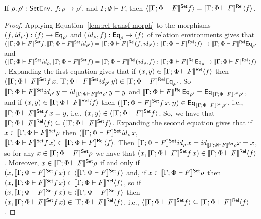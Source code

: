 \documentclass[runningheads]{llncs}
\renewcommand{\id}{\mathit{id}}
\renewcommand{\id}{\mathit{id}}
\begin{document}
%
\begin{lemma}\label{lem:graph}
If $\rho, \rho' : \mathsf{SetEnv}$, $f : \rho \to \rho'$, and $\Gamma; \Phi
\vdash F$, then $\langle {\llbracket{\Gamma; \Phi \vdash F}\rrbracket^{\mathsf{Set}}f} \rangle =
\llbracket{\Gamma; \Phi \vdash F}\rrbracket^{\mathsf{Rel}}\langle {f} \rangle$.
\end{lemma}
\begin{proof}
Applying Equation~\ref{lem:rel-transf-morph} to the morphisms $(f,
\id_{\rho'}) : \graph{f} \to \Eq_{\rho'}$ and $(\id_{\rho}, f) :
\Eq_{\rho} \to \graph{f}$ of relation environments gives that
$(\setsem{\Gamma; \Phi \vdash F}f, \setsem{\Gamma; \Phi \vdash
  F}\id_{\rho'}) = \relsem{\Gamma; \Phi \vdash F} (f, \id_{\rho'}) :
\relsem{\Gamma; \Phi \vdash F}\graph{f} \to \relsem{\Gamma; \Phi
  \vdash F}\Eq_{\rho'}$ and $(\setsem{\Gamma; \Phi \vdash
  F}\id_{\rho}, \setsem{\Gamma; \Phi \vdash F}f) = \relsem{\Gamma;
  \Phi \vdash F} (\id_{\rho}, f) : \relsem{\Gamma; \Phi \vdash
  F}\Eq_{\rho} \to \relsem{\Gamma; \Phi \vdash F}\graph{f}$.
Expanding the first equation gives that if $(x,y) \in \llbracket{\Gamma;
  \Phi \vdash F}\rrbracket^{\mathsf{Rel}}\langle {f} \rangle$ then $(\setsem{\Gamma; \Phi \vdash F} f\,
x, \setsem{\Gamma; \Phi \vdash F}\id_{\rho'}\, y) \in \relsem{\Gamma;
  \Phi \vdash F}\Eq_{\rho'}$. So $\setsem{\Gamma; \Phi \vdash
  F}\id_{\rho'}\, y = \id_{\setsem{\Gamma; \Phi \vdash F}\rho'}\, y =
y$ and $\llbracket{\Gamma; \Phi \vdash F}\rrbracket^{\mathsf{Rel}}\mathsf{Eq}_{\rho'} =
\mathsf{Eq}_{\llbracket{\Gamma; \Phi \vdash F}\rrbracket^{\mathsf{Set}}\rho'}$, and if $(x,y) \in
\llbracket{\Gamma; \Phi \vdash F}\rrbracket^{\mathsf{Rel}}\langle {f} \rangle$ then $(\llbracket{\Gamma; \Phi
  \vdash F}\rrbracket^{\mathsf{Set}} f\, x, y) \in \mathsf{Eq}_{\llbracket{\Gamma; \Phi \vdash F}\rrbracket^{\mathsf{Set}}\rho'}$,
i.e., $\llbracket{\Gamma; \Phi \vdash F}\rrbracket^{\mathsf{Set}} f\, x = y$, i.e., $(x, y) \in
\langle {\llbracket{\Gamma; \Phi \vdash F}\rrbracket^{\mathsf{Set}}f} \rangle$.  So, we have that
$\llbracket{\Gamma; \Phi \vdash F}\rrbracket^{\mathsf{Rel}}\langle {f} \rangle \subseteq
\langle {\llbracket{\Gamma; \Phi \vdash F}\rrbracket^{\mathsf{Set}}f} \rangle$.  Expanding the second
equation gives that if $x \in \llbracket{\Gamma; \Phi \vdash F}\rrbracket^{\mathsf{Set}}\rho$ then
$(\setsem{\Gamma; \Phi \vdash F}\id_{\rho}\, x,$\\
$\llbracket{\Gamma; \Phi
  \vdash F}\rrbracket^{\mathsf{Set}} f\, x) \in \llbracket{\Gamma; \Phi \vdash F}\rrbracket^{\mathsf{Rel}}\langle {f} \rangle$.  Then
$\setsem{\Gamma; \Phi \vdash F}\id_{\rho}\, x = \id_{\setsem{\Gamma;
    \Phi \vdash F}\rho} x = x$, so for any $x \in \llbracket{\Gamma; \Phi
  \vdash F}\rrbracket^{\mathsf{Set}}\rho$ we have that $(x, \llbracket{\Gamma; \Phi \vdash F}\rrbracket^{\mathsf{Set}} f\,
x) \in \llbracket{\Gamma; \Phi \vdash F}\rrbracket^{\mathsf{Rel}}\langle {f} \rangle$.  Moreover, $x \in
\llbracket{\Gamma; \Phi \vdash F}\rrbracket^{\mathsf{Set}}\rho$ if and only if $(x,
\llbracket{\Gamma; \Phi \vdash F}\rrbracket^{\mathsf{Set}} f\, x) \in \langle {\llbracket{\Gamma; \Phi
    \vdash F}\rrbracket^{\mathsf{Set}}f} \rangle$ and, if $x \in \llbracket{\Gamma; \Phi \vdash F}\rrbracket^{\mathsf{Set}}\rho$
then $(x, \llbracket{\Gamma; \Phi \vdash F}\rrbracket^{\mathsf{Set}} f\, x) \in \llbracket{\Gamma;
  \Phi \vdash F}\rrbracket^{\mathsf{Rel}} \langle {f} \rangle$, so if $(x, \llbracket{\Gamma; \Phi \vdash F}\rrbracket^{\mathsf{Set}}
f\, x) \in \langle {\llbracket{\Gamma; \Phi \vdash F}\rrbracket^{\mathsf{Set}}f} \rangle$ then $(x,
\llbracket{\Gamma; \Phi \vdash F}\rrbracket^{\mathsf{Set}} f\, x) \in \llbracket{\Gamma; \Phi \vdash
  F}\rrbracket^{\mathsf{Rel}} \langle {f} \rangle$, i.e., $\langle {\llbracket{\Gamma; \Phi \vdash F}\rrbracket^{\mathsf{Set}}f} \rangle
\subseteq \llbracket{\Gamma; \Phi \vdash F}\rrbracket^{\mathsf{Rel}} \langle {f} \rangle$.
\end{proof}
\end{document}
